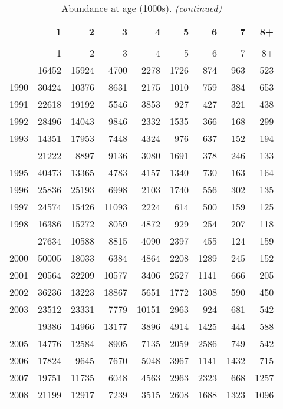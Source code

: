\documentclass[
]{article}
\begin{document}
\begin{longtable}[t]{lrrrrrrrr}
\caption{\label{tab:NAA-table}Abundance at age (1000s).}\\
\toprule
  & 1 & 2 & 3 & 4 & 5 & 6 & 7 & 8+\\
\midrule
\endfirsthead
\caption[]{Abundance at age (1000s). \textit{(continued)}}\\
\toprule
  & 1 & 2 & 3 & 4 & 5 & 6 & 7 & 8+\\
\midrule
\endhead

\endfoot
\bottomrule
\endlastfoot
1989 & 16452 & 15924 & 4700 & 2278 & 1726 & 874 & 963 & 523\\
1990 & 30424 & 10376 & 8631 & 2175 & 1010 & 759 & 384 & 653\\
1991 & 22618 & 19192 & 5546 & 3853 & 927 & 427 & 321 & 438\\
1992 & 28496 & 14043 & 9846 & 2332 & 1535 & 366 & 168 & 299\\
1993 & 14351 & 17953 & 7448 & 4324 & 976 & 637 & 152 & 194\\
\addlinespace
1994 & 21222 & 8897 & 9136 & 3080 & 1691 & 378 & 246 & 133\\
1995 & 40473 & 13365 & 4783 & 4157 & 1340 & 730 & 163 & 164\\
1996 & 25836 & 25193 & 6998 & 2103 & 1740 & 556 & 302 & 135\\
1997 & 24574 & 15426 & 11093 & 2224 & 614 & 500 & 159 & 125\\
1998 & 16386 & 15272 & 8059 & 4872 & 929 & 254 & 207 & 118\\
\addlinespace
1999 & 27634 & 10588 & 8815 & 4090 & 2397 & 455 & 124 & 159\\
2000 & 50005 & 18033 & 6384 & 4864 & 2208 & 1289 & 245 & 152\\
2001 & 20564 & 32209 & 10577 & 3406 & 2527 & 1141 & 666 & 205\\
2002 & 36236 & 13223 & 18867 & 5651 & 1772 & 1308 & 590 & 450\\
2003 & 23512 & 23331 & 7779 & 10151 & 2963 & 924 & 681 & 542\\
\addlinespace
2004 & 19386 & 14966 & 13177 & 3896 & 4914 & 1425 & 444 & 588\\
2005 & 14776 & 12584 & 8905 & 7135 & 2059 & 2586 & 749 & 542\\
2006 & 17824 & 9645 & 7670 & 5048 & 3967 & 1141 & 1432 & 715\\
2007 & 19751 & 11735 & 6048 & 4563 & 2963 & 2323 & 668 & 1257\\
2008 & 21199 & 12917 & 7239 & 3515 & 2608 & 1688 & 1323 & 1096\\

\end{longtable}
\end{document}
